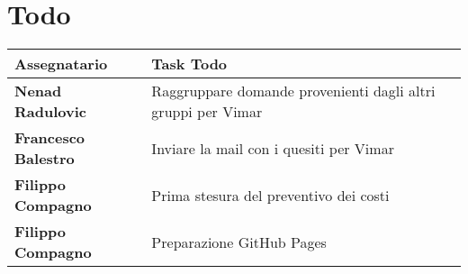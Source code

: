 \documentclass[a4paper,12pt]{article}
\begin{document}
\section{Todo}

\begin{tabularx}{\textwidth}{|X|X|}
\hline
\textbf{Assegnatario} & \textbf{Task Todo} \\
\hline
\textbf{Nenad Radulovic} & Raggruppare domande provenienti dagli altri gruppi per Vimar \\
\hline
\textbf{Francesco Balestro} & Inviare la mail con i quesiti per \mbox{Vimar}
\\
\hline
\textbf{Filippo Compagno} & Prima stesura del preventivo dei costi\\
\hline
\textbf{Filippo Compagno} & Preparazione GitHub Pages\\
\hline

\end{tabularx}
\end{document}
